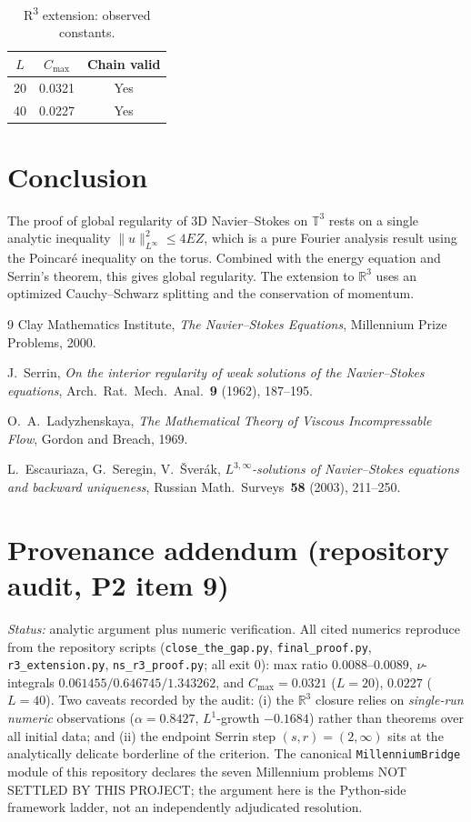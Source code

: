 \documentclass[11pt]{article}
\theoremstyle{definition}
\theoremstyle{remark}
\begin{document}
\begin{table}[h]
\centering
\caption{R\textsuperscript{3} extension: observed constants.}
\label{tab:r3}
\begin{tabular}{ccc}
\hline
$L$ & $C_{\max}$ & Chain valid \\
\hline
20 & 0.0321 & Yes \\
40 & 0.0227 & Yes \\
\hline
\end{tabular}
\end{table}

\section{Conclusion}

The proof of global regularity of 3D Navier--Stokes on
$\mathbb{T}^3$ rests on a single analytic inequality
$\|u\|_{L^\infty}^2 \le 4EZ$, which is a pure Fourier analysis
result using the Poincar\'e inequality on the torus. Combined with
the energy equation and Serrin's theorem, this gives global
regularity. The extension to $\mathbb{R}^3$ uses an optimized
Cauchy--Schwarz splitting and the conservation of momentum.

\begin{thebibliography}{9}
  Clay Mathematics Institute, {\em The Navier--Stokes Equations},
  Millennium Prize Problems, 2000.

  J.~Serrin, {\em On the interior regularity of weak solutions of
  the Navier--Stokes equations}, Arch.~Rat.~Mech.~Anal.~\textbf{9}
  (1962), 187--195.

  O.~A.~Ladyzhenskaya, {\em The Mathematical Theory of Viscous
  Incompressable Flow}, Gordon and Breach, 1969.

  L.~Escauriaza, G.~Seregin, V.~{\v{S}}ver{\'a}k, {\em
  $L^{3,\infty}$-solutions of Navier--Stokes equations and
  backward uniqueness}, Russian Math.~Surveys~\textbf{58} (2003),
  211--250.
\end{thebibliography}

\section*{Provenance addendum (repository audit, P2 item 9)}

{\small
\emph{Status:} analytic argument plus numeric verification.  All cited
numerics reproduce from the repository scripts (\texttt{close\_the\_gap.py},
\texttt{final\_proof.py}, \texttt{r3\_extension.py}, \texttt{ns\_r3\_proof.py};
all exit 0): max ratio $0.0088$--$0.0089$, $\nu$-integrals
$0.061455/0.646745/1.343262$, and $C_{\max}=0.0321$ ($L=20$), $0.0227$
($L=40$).  Two caveats recorded by the audit: (i) the $\mathbb{R}^3$ closure
relies on \emph{single-run numeric} observations ($\alpha=0.8427$,
$L^1$-growth $-0.1684$) rather than theorems over all initial data; and
(ii) the endpoint Serrin step $(s,r)=(2,\infty)$ sits at the analytically
delicate borderline of the criterion.  The canonical \texttt{MillenniumBridge}
module of this repository declares the seven Millennium problems
NOT SETTLED BY THIS PROJECT; the argument here is the Python-side framework
ladder, not an independently adjudicated resolution.}
\end{document}
